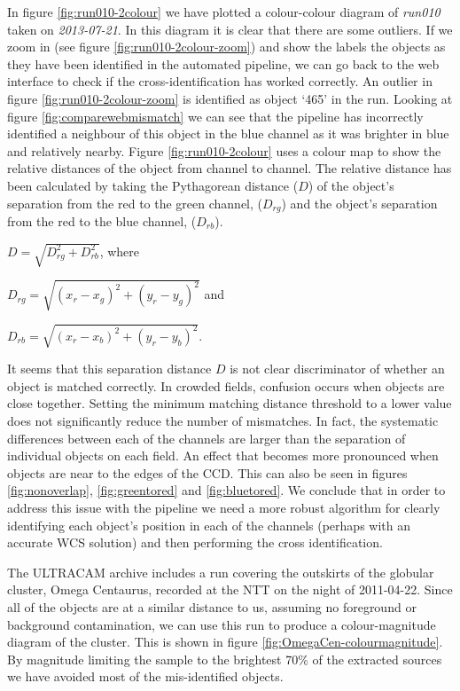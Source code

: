 In figure \ref{fig:run010-2colour} we have plotted a colour-colour diagram of \emph{run010} taken on \emph{2013-07-21}. In this diagram it is clear that there are some outliers. If we zoom in (see figure \ref{fig:run010-2colour-zoom}) and show the labels the objects as they have been identified in the automated pipeline, we can go back to the web interface to check if the cross-identification has worked correctly. An outlier in figure \ref{fig:run010-2colour-zoom} is identified as object `465' in the run. Looking at figure \ref{fig:comparewebmismatch} we can see that the pipeline has incorrectly identified a neighbour of this object in the blue channel as it was brighter in blue and relatively nearby. Figure \ref{fig:run010-2colour} uses a colour map to show the relative distances of the object from channel to channel. The relative distance has been calculated by taking the Pythagorean distance ($D$) of the object's separation from the red to the green channel, ($D_{rg}$) and the object's separation from the red to the blue channel, ($D_{rb}$).  

$D = \sqrt{ D_{rg}^2 + D_{rb}^2}$, where

$D_{rg} = \sqrt{ (x_r - x_g)^2 + (y_r - y_g)^2} $ and

$D_{rb} = \sqrt{ (x_r - x_b)^2 + (y_r - y_b)^2} $.

It seems that this separation distance $D$ is not clear discriminator of whether an object is matched correctly. In crowded fields, confusion occurs when objects are close together. Setting the minimum matching distance threshold to a lower value does not significantly reduce the number of mismatches. In fact, the systematic differences between each of the channels are larger than the separation of individual objects on each field. An effect that becomes more pronounced when objects are near to the edges of the CCD. This can also be seen in figures  \ref{fig:nonoverlap}, \ref{fig:greentored} and \ref{fig:bluetored}.  We conclude that in order to address this issue with the pipeline we need a more robust algorithm for clearly identifying each object's position in each of the channels (perhaps with an accurate WCS solution) and then performing the cross identification. 

The ULTRACAM archive includes a run covering the outskirts of the globular cluster, Omega Centaurus, recorded at the NTT on the night of 2011-04-22.  Since all of the objects are at a similar distance to us, assuming no foreground or background contamination, we can use this run to produce a colour-magnitude diagram of the cluster. This is shown in  figure \ref{fig:OmegaCen-colourmagnitude}. By magnitude limiting the sample to the brightest 70\% of the extracted sources we have avoided most of the mis-identified objects. 

